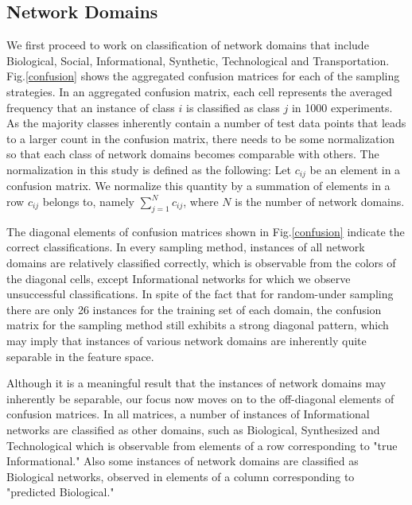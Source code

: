  
\subsection*{Network Domains} 
We first proceed to work on classification of network domains that include Biological, Social, Informational, Synthetic, Technological and Transportation. Fig.\ref{confusion} shows the aggregated confusion matrices for each of the sampling strategies. In an aggregated confusion matrix, each cell represents the averaged frequency that an instance of class $i$ is classified as class $j$ in 1000 experiments. As the majority classes inherently contain a number of test data points that leads to a larger count in the confusion matrix, there needs to be some normalization so that each class of network domains becomes comparable with others. The normalization in this study is defined as the following: Let $c_{ij}$ be an element in a confusion matrix. We normalize this quantity by a summation of elements in a row $c_{ij}$ belongs to, namely $\sum_{j=1}^N c_{ij}$, where $N$ is the number of network domains. 

The diagonal elements of confusion matrices shown in Fig.\ref{confusion} indicate the correct classifications. In every sampling method, instances of all network domains are relatively classified correctly, which is observable from the colors of the diagonal cells, except Informational networks for which we observe unsuccessful classifications. In spite of the fact that for random-under sampling there are only 26 instances for the training set of each domain, the confusion matrix for the sampling method still exhibits a strong diagonal pattern, which may imply that instances of various network domains are inherently quite separable in the feature space.

Although it is a meaningful result that the instances of network domains may inherently be separable, our focus now moves on to the off-diagonal elements of confusion matrices. In all matrices, a number of instances of Informational networks are classified as other domains, such as Biological, Synthesized and Technological which is observable from elements of a row corresponding to  "true Informational." Also some instances of network domains are classified as Biological networks, observed in elements of a column corresponding to "predicted Biological." 

